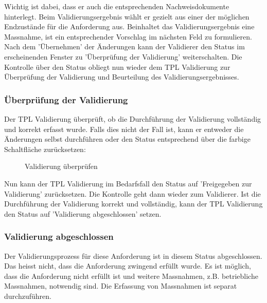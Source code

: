 Wichtig ist dabei, dass er auch die entsprechenden Nachweisdokumente hinterlegt. Beim Validierungsergebnis wählt er gezielt aus einer der möglichen Endzustände für die Anforderung aus. Beinhaltet das Validierungsergebnis eine Massnahme, ist ein entsprechender Vorschlag im nächsten Feld zu formulieren. \\
 
Nach dem 'Übernehmen' der Änderungen kann der Validierer den Status im erscheinenden Fenster zu 'Überprüfung der Validierung' weiterschalten. Die Kontrolle über den Status obliegt nun wieder dem TPL Validierung zur Überprüfung der Validierung und Beurteilung des Validierungsergebnisses. 

\subsubsection{Überprüfung der Validierung}
\label{bkm:Ref2018071812}

Der TPL Validierung überprüft, ob die Durchführung der Validierung vollständig und korrekt erfasst wurde. Falls dies nicht der Fall ist, kann er entweder die Änderungen selbst durchführen oder den Status entsprechend über die farbige Schaltfläche zurücksetzen: 

\begin{figure}[H]
\caption{Validierung überprüfen}
\end{figure}

Nun kann der TPL Validierung im Bedarfsfall den Status auf 'Freigegeben zur Validierung' zurücksetzen. Die Kontrolle geht dann wieder zum Validierer. Ist die Durchführung der Validierung korrekt und vollständig, kann der TPL Validierung den Status auf 'Validierung abgeschlossen' setzen. 

\subsubsection{Validierung abgeschlossen}

Der Validierungsprozess für diese Anforderung ist in diesem Status abgeschlossen. Das heisst nicht, dass die Anforderung zwingend erfüllt wurde. Es ist möglich, dass die Anforderung nicht erfüllt ist und weitere Massnahmen, z.B. betriebliche Massnahmen, notwendig sind. Die Erfassung von Massnahmen ist separat durchzuführen.

